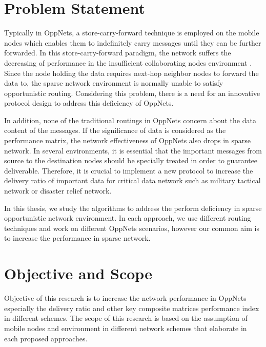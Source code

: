 \section{Problem Statement}
\label{intro:Problem Statement}
Typically in OppNets, a store-carry-forward technique is employed on the mobile nodes which enables them to indefinitely carry messages until they can be further forwarded.
%
In this store-carry-forward paradigm, the network suffers the decreasing of performance in the insufficient collaborating nodes environment \cite{Nousiainen2013,Spyropoulos2010}.
%
Since the node holding the data requires next-hop neighbor nodes to forward the data to, the sparse network environment is normally unable to satisfy opportunistic routing.
%
Considering this problem, there is a need for an innovative protocol design to address this deficiency of OppNets.

In addition, none of the traditional routings in OppNets concern about the data content of the messages. 
If the significance of data is considered as the performance matrix, the network effectiveness of OppNets also drops in sparse network. 
In several environments, it is essential that the important messages from source to the destination nodes should be specially treated in order to guarantee deliverable.
Therefore, it is crucial to implement a new protocol to increase the delivery ratio of important data for critical data network such as military tactical network or disaster relief network.

In this thesis, we study the algorithms to address the perform deficiency in sparse opportunistic network environment.
In each approach, we use different routing techniques and work on different OppNets scenarios, however our common aim is to increase the performance in sparse network.
\section{Objective and Scope}
\label{intro:Objective and Scope}
Objective of this research is to increase the network performance in OppNets especially the delivery ratio and other key composite matrices performance index in different schemes.
The scope of this research is based on the assumption of mobile nodes and environment in different network schemes that elaborate in each proposed approaches.

